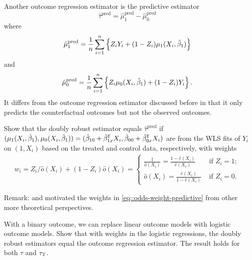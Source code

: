 \begin{HomeworkProblem}\label{exr:14-2}

Another outcome regression estimator is the predictive estimator
\[
\hat{\tau}^\text{pred} =
\hat{\mu}_1^\text{pred} - \hat{\mu}_0^\text{pred}
\]
where
\[
\hat{\mu}_1^\text{pred} =
\frac{1}{n} \sum_{i=1}^n \left\{  Z_i Y_i + (1-Z_i)  \mu_1(X_i, \hat{\beta}_1)   \right\}
\]
and
\[
\hat{\mu}_0^\text{pred}  =
\frac{1}{n} \sum_{i=1}^n \left\{  Z_i \mu_0(X_i, \hat{\beta}_1) + (1-Z_i) Y_i  \right\} .
\]
It differs from the outcome regression estimator discussed before in that it only predicts the counterfactual outcomes but not the observed outcomes.

Show that the doubly robust estimator  equals $\hat{\tau}^\text{pred} $ if $(\mu_1(X_i, \hat{\beta}_1), \mu_0(X_i, \hat{\beta}_1) ) =
( \hat \beta_{10} +   \hat \beta_{1x}^{\mkern-1.5mu\mathsf{T}} X_i, \hat \beta_{00} +   \hat\beta_{0x}^{\mkern-1.5mu\mathsf{T}} X_i)$ are from the WLS fits of $Y_i$ on $(1, X_i)$ based on the treated and control data, respectively, with weights
\begin{eqnarray}
w_i =  Z_i/\hat{o}(X_i) + (1-Z_i) \hat{o}(X_i)
= \begin{cases}
\frac{1}{\hat{o}(X_i)} = \frac{ 1-  \hat{e}(X_i) }{ \hat{e}(X_i) } & \text{ if } Z_i=1;\\
 \hat{o}(X_i) = \frac{  \hat{e}(X_i)  }{ 1-\hat{e}(X_i)} & \text{ if } Z_i=0.
\end{cases}
\end{eqnarray}

Remark:
\citet{cao2009improving} and  \citet{vermeulen2015bias} motivated the weights in \eqref{eq::odds-weight-predictive} from other more theoretical perspectives.



\end{HomeworkProblem}

\begin{HomeworkProblem}\label{exr:14-3}
With a binary outcome, we can replace linear outcome models with logistic outcome models. Show that with weights in the logistic regressions, the doubly robust estimators equal the outcome regression estimator. The result holds for both $\tau$ and $\tau_\textsc{T}$.



\end{HomeworkProblem}

